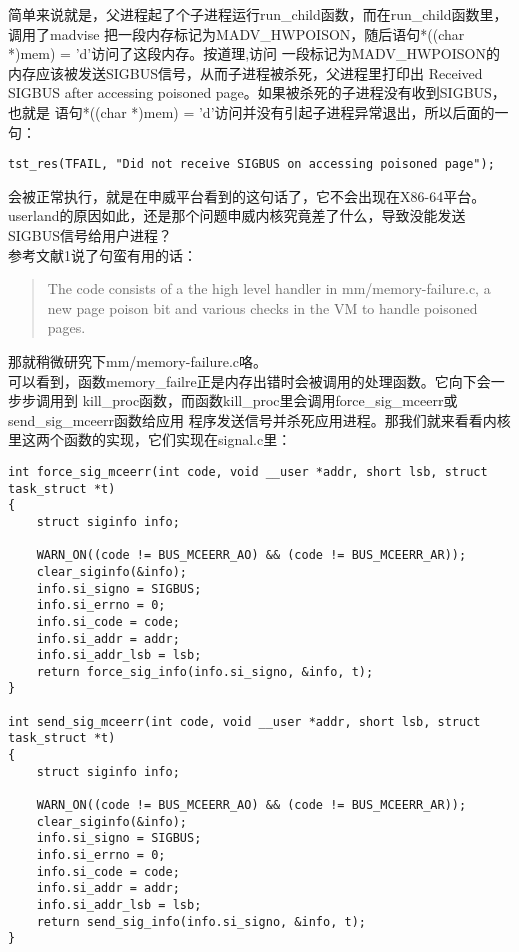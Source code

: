 \documentclass[scheme=plain]{ctexart}
\begin{document}
\begin{enumerate}
  简单来说就是，父进程起了个子进程运行run\_child函数，而在run\_child函数里，调用了madvise
  把一段内存标记为MADV\_HWPOISON，随后语句*((char *)mem) = 'd'访问了这段内存。按道理,访问
  一段标记为MADV\_HWPOISON的内存应该被发送SIGBUS信号，从而子进程被杀死，父进程里打印出
  Received SIGBUS after accessing poisoned page。如果被杀死的子进程没有收到SIGBUS，也就是
  语句*((char *)mem) = 'd'访问并没有引起子进程异常退出，所以后面的一句：
\begin{verbatim}
tst_res(TFAIL, "Did not receive SIGBUS on accessing poisoned page");
\end{verbatim}
  会被正常执行，就是在申威平台看到的这句话了，它不会出现在X86-64平台。\\

  userland的原因如此，还是那个问题申威内核究竟差了什么，导致没能发送SIGBUS信号给用户进程？\\
  
  参考文献1说了句蛮有用的话：

  \begin{quote}
    The code consists of a the high level handler in mm/memory-failure.c, a new page
    poison bit and various checks in the VM to handle poisoned pages.
  \end{quote}

  那就稍微研究下mm/memory-failure.c咯。\\

  可以看到，函数memory\_failre正是内存出错时会被调用的处理函数。它向下会一步步调用到
  kill\_proc函数，而函数kill\_proc里会调用force\_sig\_mceerr或send\_sig\_mceerr函数给应用
  程序发送信号并杀死应用进程。那我们就来看看内核里这两个函数的实现，它们实现在signal.c里：
  
\begin{verbatim}
int force_sig_mceerr(int code, void __user *addr, short lsb, struct task_struct *t)
{
	struct siginfo info;

	WARN_ON((code != BUS_MCEERR_AO) && (code != BUS_MCEERR_AR));
	clear_siginfo(&info);
	info.si_signo = SIGBUS;
	info.si_errno = 0;
	info.si_code = code;
	info.si_addr = addr;
	info.si_addr_lsb = lsb;
	return force_sig_info(info.si_signo, &info, t);
}

int send_sig_mceerr(int code, void __user *addr, short lsb, struct task_struct *t)
{
	struct siginfo info;

	WARN_ON((code != BUS_MCEERR_AO) && (code != BUS_MCEERR_AR));
	clear_siginfo(&info);
	info.si_signo = SIGBUS;
	info.si_errno = 0;
	info.si_code = code;
	info.si_addr = addr;
	info.si_addr_lsb = lsb;
	return send_sig_info(info.si_signo, &info, t);
}
\end{verbatim}


\end{enumerate}
\end{document}

